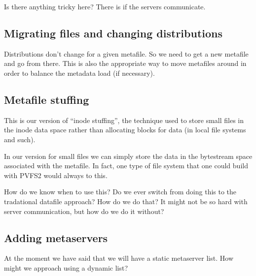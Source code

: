 \documentclass[10pt]{article} %
\begin{document}
Is there anything tricky here?  There is if the servers communicate.

\subsection{Migrating files and changing distributions}

Distributions don't change for a given metafile.  So we need to get a new
metafile and go from there.  This is also the appropriate way to move
metafiles around in order to balance the metadata load (if necessary).

\subsection{Metafile stuffing}

This is our version of ``inode stuffing'', the technique used to store small
files in the inode data space rather than allocating blocks for data (in local
file systems and such).

In our version for small files we can simply store the data in the bytestream
space associated with the metafile.  In fact, one type of file system that one
could build with PVFS2 would always to this.

How do we know when to use this?  Do we ever switch from doing this to the
tradational datafile approach?  How do we do that?  It might not be so hard
with server communication, but how do we do it without?

\subsection{Adding metaservers}

At the moment we have said that we will have a static metaserver list.  How
might we approach using a dynamic list?
\end{document}

